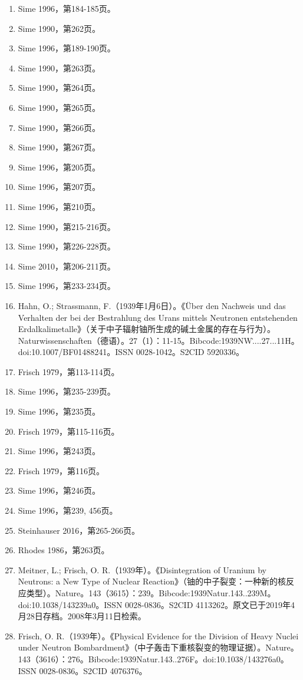\begin{enumerate}
\item Sime 1996，第184-185页。
\item Sime 1990，第262页。
\item Sime 1996，第189-190页。
\item Sime 1990，第263页。
\item Sime 1990，第264页。
\item Sime 1990，第265页。
\item Sime 1990，第266页。
\item Sime 1990，第267页。
\item Sime 1996，第205页。
\item Sime 1996，第207页。
\item Sime 1996，第210页。
\item Sime 1990，第215-216页。
\item Sime 1990，第226-228页。
\item Sime 2010，第206-211页。
\item Sime 1996，第233-234页。
\item Hahn, O.; Strassmann, F.（1939年1月6日）。《Über den Nachweis und das Verhalten der bei der Bestrahlung des Urans mittels Neutronen entstehenden Erdalkalimetalle》（关于中子辐射铀所生成的碱土金属的存在与行为）。Naturwissenschaften（德语）。27（1）：11-15。Bibcode:1939NW\.....27...11H。doi:10.1007/BF01488241。ISSN 0028-1042。S2CID 5920336。
\item Frisch 1979，第113-114页。
\item Sime 1996，第235-239页。
\item Sime 1996，第235页。
\item Frisch 1979，第115-116页。
\item Sime 1996，第243页。
\item Frisch 1979，第116页。
\item Sime 1996，第246页。
\item Sime 1996，第239, 456页。
\item Steinhauser 2016，第265-266页。
\item Rhodes 1986，第263页。
\item Meitner, L.; Frisch, O. R.（1939年）。《Disintegration of Uranium by Neutrons: a New Type of Nuclear Reaction》（铀的中子裂变：一种新的核反应类型）。Nature。143（3615）：239。Bibcode:1939Natur.143..239M。doi:10.1038/143239a0。ISSN 0028-0836。S2CID 4113262。原文已于2019年4月28日存档。2008年3月11日检索。
\item Frisch, O. R.（1939年）。《Physical Evidence for the Division of Heavy Nuclei under Neutron Bombardment》（中子轰击下重核裂变的物理证据）。Nature。143（3616）：276。Bibcode:1939Natur.143..276F。doi:10.1038/143276a0。ISSN 0028-0836。S2CID 4076376。

\end{enumerate}
